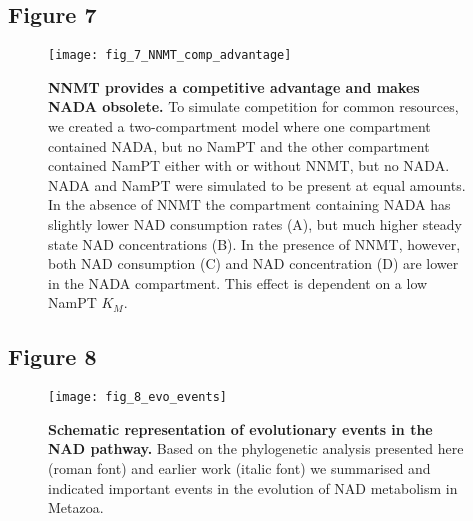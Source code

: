 \newpage


\subsection*{Figure 7}

\begin{figure}[ht]
  \centering
  \texttt{[image: fig\_7\_NNMT\_comp\_advantage]}
  \caption{\textbf{NNMT provides a competitive advantage and makes NADA obsolete.} To simulate competition for common resources, we created a two-compartment model where one compartment contained NADA, but no NamPT and the other compartment contained NamPT either with or without NNMT, but no NADA. NADA and NamPT were simulated to be present at equal amounts. In the absence of NNMT the compartment containing NADA has slightly lower NAD consumption rates (A), but much higher steady state NAD concentrations (B). In the presence of NNMT, however, both NAD consumption (C) and NAD concentration (D) are lower in the NADA compartment. This effect is dependent on a low NamPT $K_{M}$.}
  \label{fig:NNMT_comp_advantage}
\end{figure}

\newpage


\subsection*{Figure 8}

\begin{figure}[ht]
  \centering
  \texttt{[image: fig\_8\_evo\_events]}
  \caption{\textbf{Schematic representation of evolutionary events in the NAD pathway.} Based on the phylogenetic analysis presented here (roman font) and earlier work \cite{Lau2010} (italic font) we summarised and indicated important events in the evolution of NAD metabolism in Metazoa.}
  \label{fig:evo_events}
\end{figure}
